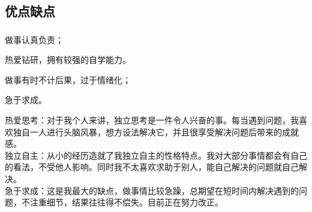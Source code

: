 \subsection{优点缺点}
\frame
{	\frametitle{\secname}
	\begin{block}{\Smiley}
		\begin{strength}{}{}
			\centering
			做事认真负责；
		\end{strength}
		\begin{strength}{}{}
			\centering
			热爱钻研，拥有较强的自学能力。
		\end{strength}
	\end{block}
	\begin{block}{\Frowny}
		\begin{weakness}{}{}
			\centering
			做事有时不计后果，过于情绪化；
		\end{weakness}
		\begin{weakness}{}{}
			\centering
			\ding{42}急于求成。
		\end{weakness}
	\end{block}
}
\note
{	热爱思考：对于我个人来讲，独立思考是一件令人兴奋的事。每当遇到问题，我喜欢独自一人进行头脑风暴，想方设法解决它，并且很享受解决问题后带来的成就感。
	\\独立自主：从小的经历造就了我独立自主的性格特点。我对大部分事情都会有自己的看法，不受他人影响。同时我不太喜欢求助于别人，能自己解决的问题就自己解决。
	\\急于求成：这是我最大的缺点，做事情比较急躁，总期望在短时间内解决遇到的问题，不注重细节，结果往往得不偿失。目前正在努力改正。}
